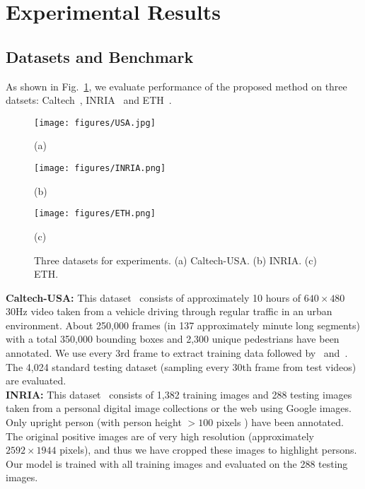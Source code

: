 \documentclass[journal]{IEEEtran}
\begin{document}
\section{Experimental Results}
\label{sec:Experiments}

\subsection{Datasets and Benchmark}
\label{subsec:Dataset}

As shown in Fig.~\ref{fig:dataset}, we evaluate performance of the proposed method on three datsets: Caltech~\cite{Dollar2012PAMI}, INRIA~\cite{dalal2005histograms} and ETH~\cite{eth_biwi_00534}.

  \begin{figure}[t]
 \centering
\begin{minipage}[b]{0.32\linewidth}
  \centering
  \centerline{\texttt{[image: figures/USA.jpg]}}
  \centerline{(a) }
\end{minipage}
\begin{minipage}[b]{0.32\linewidth}
  \centering
  \centerline{\texttt{[image: figures/INRIA.png]}}
  \centerline{(b) }
\end{minipage}
\begin{minipage}[b]{0.32\linewidth}
  \centering
  \centerline{\texttt{[image: figures/ETH.png]}}
  \centerline{(c) }
\end{minipage}

\caption{Three datasets for experiments. (a) Caltech-USA. (b) INRIA. (c) ETH. }
\label{fig:dataset}
\end{figure}

\textbf{Caltech-USA:} This dataset~\cite{Dollar2012PAMI} consists of approximately 10 hours of $640 \times 480$ 30Hz video taken from a vehicle driving through regular traffic in an urban environment. About 250,000 frames (in 137 approximately minute long segments) with a total 350,000 bounding boxes and 2,300 unique pedestrians have been annotated. We use every 3rd frame to extract training data followed by~\cite{hosang2015taking} and~\cite{nam2014local}. The 4,024 standard testing dataset (sampling every 30th frame from test videos) are evaluated.   \\

\textbf{INRIA:} This dataset~\cite{dalal2005histograms} consists of 1,382 training images and 288 testing images taken from a personal digital image collections or the web using Google images. Only upright person (with person height $> 100$ pixels ) have been annotated. The original positive images are of very high resolution (approximately $2592 \times 1944$ pixels), and thus we have cropped these images to highlight persons. Our model is trained with all training images and evaluated on the 288 testing images.   \\
\end{document}
